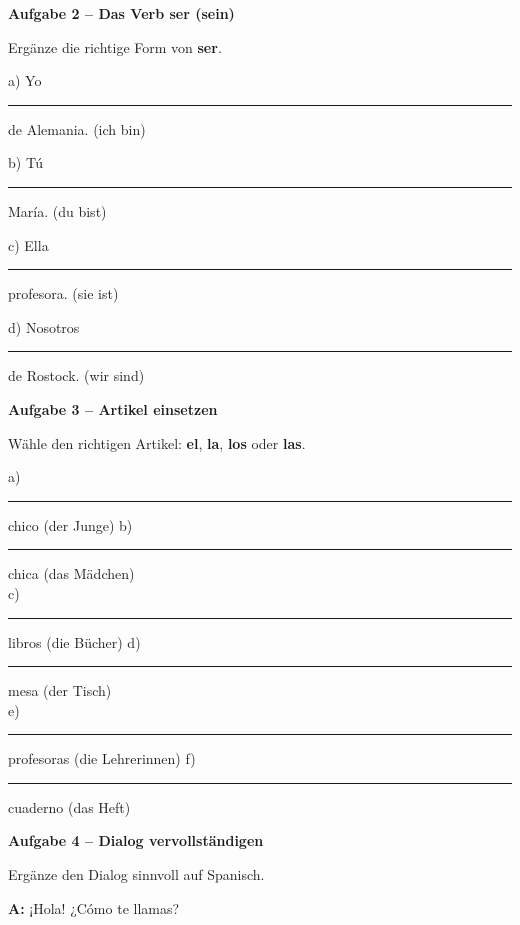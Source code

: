 \documentclass[11pt, a4paper]{article}
\newcommand{\fachfarbe}{spanisch}
\newcommand{\punktebox}[1]{\hfill\fbox{\small \_/#1}}
\newcommand{\luecke}[1]{\rule{#1}{0.4pt}}
\newenvironment{aufgabe}[1]{%
    \needspace{5\baselineskip}%
    \nopagebreak[4]%
    \vspace{10pt}
    \noindent\textbf{\textcolor{\fachfarbe}{Aufgabe #1}}
    \nopagebreak[4]%
    \vspace{5pt}
    \nopagebreak[4]%
    \begin{list}{}{\leftmargin=0pt}
    \item[]
}{%
    \end{list}
}
\newcommand{\es}[1]{\textcolor{\fachfarbe}{\textbf{#1}}}
\begin{document}
\begin{aufgabe}{2 -- Das Verb \es{ser} (sein)}
Ergänze die richtige Form von \es{ser}. \punktebox{4}
\end{aufgabe}

\noindent
a) Yo \luecke{2.5cm} de Alemania. \hfill (ich bin)

\vspace{0.8em}

\noindent
b) Tú \luecke{2.5cm} María. \hfill (du bist)

\vspace{0.8em}

\noindent
c) Ella \luecke{2.5cm} profesora. \hfill (sie ist)

\vspace{0.8em}

\noindent
d) Nosotros \luecke{2.5cm} de Rostock. \hfill (wir sind)

\vspace{15pt}


\begin{aufgabe}{3 -- Artikel einsetzen}
Wähle den richtigen Artikel: \es{el}, \es{la}, \es{los} oder \es{las}. \punktebox{6}
\end{aufgabe}

\noindent
a) \luecke{1.5cm} chico (der Junge) \hfill
b) \luecke{1.5cm} chica (das Mädchen) \\[0.8em]
c) \luecke{1.5cm} libros (die Bücher) \hfill
d) \luecke{1.5cm} mesa (der Tisch) \\[0.8em]
e) \luecke{1.5cm} profesoras (die Lehrerinnen) \hfill
f) \luecke{1.5cm} cuaderno (das Heft) \\

\vspace{15pt}


\begin{aufgabe}{4 -- Dialog vervollständigen}
Ergänze den Dialog sinnvoll auf Spanisch. \punktebox{6}
\end{aufgabe}

\noindent
\textbf{A:} ¡Hola! ¿Cómo te llamas?

\vspace{0.8em}
\end{document}
